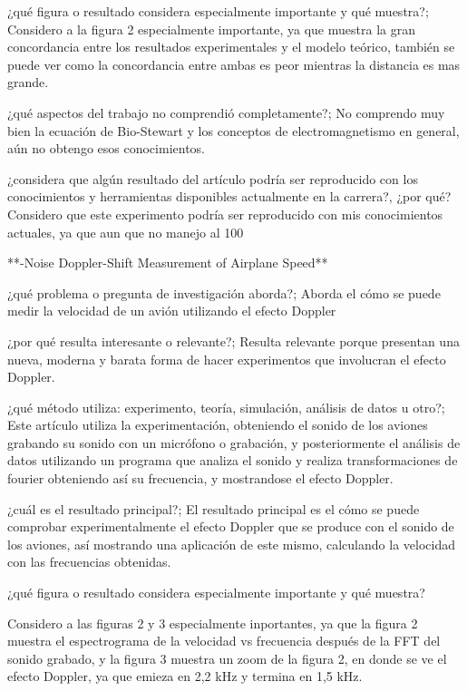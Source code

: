 \documentclass{article}
\begin{document}
¿qué figura o resultado considera especialmente importante y qué muestra?;
Considero a la figura 2 especialmente importante, ya que muestra la gran concordancia entre los resultados experimentales y el modelo teórico, también se puede ver como la concordancia entre ambas es peor mientras la distancia es mas grande. 

¿qué aspectos del trabajo no comprendió completamente?;
No comprendo muy bien la ecuación de Bio-Stewart y los conceptos de electromagnetismo en general, aún no obtengo esos conocimientos.

¿considera que algún resultado del artículo podría ser reproducido con los conocimientos y
herramientas disponibles actualmente en la carrera?, ¿por qué?
Considero que este experimento podría ser reproducido con mis conocimientos actuales, ya que aun que no manejo al 100%




**-Noise Doppler-Shift Measurement of Airplane Speed**

¿qué problema o pregunta de investigación aborda?;
Aborda el cómo se puede medir la velocidad de un avión utilizando el efecto Doppler

¿por qué resulta interesante o relevante?;
Resulta relevante porque presentan una nueva, moderna y barata forma de hacer experimentos que involucran el efecto Doppler. 

¿qué método utiliza: experimento, teoría, simulación, análisis de datos u otro?;
Este artículo utiliza la experimentación, obteniendo el sonido de los aviones grabando su sonido con un micrófono o grabación, y posteriormente el análisis de datos utilizando un programa que analiza el sonido y realiza transformaciones de fourier obteniendo así su frecuencia, y mostrandose el efecto Doppler.

¿cuál es el resultado principal?;
El resultado principal es el cómo se puede comprobar experimentalmente el efecto Doppler que se produce con el sonido de los aviones, así mostrando una aplicación de este mismo, calculando la velocidad con las frecuencias obtenidas.

¿qué figura o resultado considera especialmente importante y qué muestra?

Considero a las figuras 2 y 3 especialmente inportantes, ya que la figura 2 muestra el espectrograma de la velocidad vs frecuencia después de la FFT  del sonido grabado, y la figura 3 muestra un zoom de la figura 2, en donde se ve el efecto Doppler, ya que emieza en 2,2 kHz y termina en 1,5 kHz.
\end{document}
